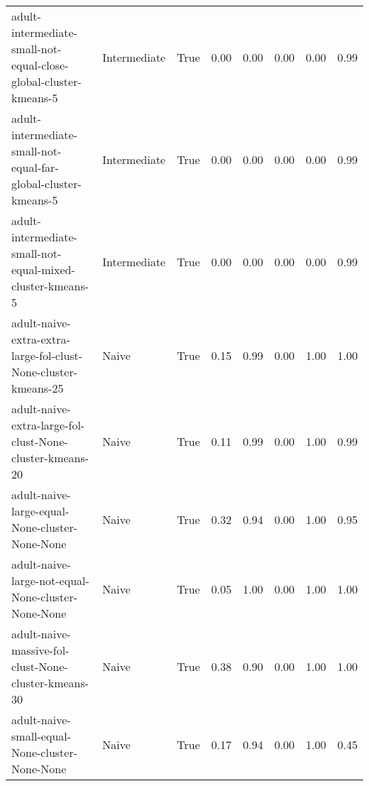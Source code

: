 \begin{longtable}{llllllll}
                                             adult-intermediate-small-not-equal-close-global-cluster-kmeans-5 & Intermediate &        True &                 0.00 &                 0.00 &                         0.00 &                         0.00 &                         0.99 \\
                                               adult-intermediate-small-not-equal-far-global-cluster-kmeans-5 & Intermediate &        True &                 0.00 &                 0.00 &                         0.00 &                         0.00 &                         0.99 \\
                                                    adult-intermediate-small-not-equal-mixed-cluster-kmeans-5 & Intermediate &        True &                 0.00 &                 0.00 &                         0.00 &                         0.00 &                         0.99 \\
                                               adult-naive-extra-extra-large-fol-clust-None-cluster-kmeans-25 &        Naive &        True &                 0.15 &                 0.99 &                         0.00 &                         1.00 &                         1.00 \\
                                                     adult-naive-extra-large-fol-clust-None-cluster-kmeans-20 &        Naive &        True &                 0.11 &                 0.99 &                         0.00 &                         1.00 &                         0.99 \\
                                                               adult-naive-large-equal-None-cluster-None-None &        Naive &        True &                 0.32 &                 0.94 &                         0.00 &                         1.00 &                         0.95 \\
                                                           adult-naive-large-not-equal-None-cluster-None-None &        Naive &        True &                 0.05 &                 1.00 &                         0.00 &                         1.00 &                         1.00 \\
                                                         adult-naive-massive-fol-clust-None-cluster-kmeans-30 &        Naive &        True &                 0.38 &                 0.90 &                         0.00 &                         1.00 &                         1.00 \\
                                                               adult-naive-small-equal-None-cluster-None-None &        Naive &        True &                 0.17 &                 0.94 &                         0.00 &                         1.00 &                         0.45 \\

\end{longtable}
